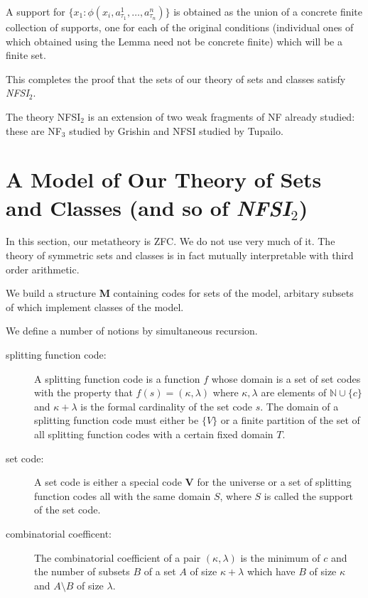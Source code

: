 \documentclass{article}
\begin{document}
\begin{description}
\begin{description}
A support for $\{x_1:\phi(x_i,a^1_{\tau_1},\ldots,a^n_{\tau_n})\}$ is obtained as the union of a concrete finite collection of supports, one for each of the original conditions (individual ones of which obtained using the Lemma need not be concrete finite) which will be a finite set.

This completes the proof that the sets of our theory of sets and classes satisfy {\em NFSI$_2$\/}.

\end{description}

The theory NFSI$_2$ is an extension of two weak fragments of NF already studied:  these are NF$_3$ studied by Grishin and NFSI studied by Tupailo.

\section{A Model of Our Theory of Sets and Classes (and so of {\em NFSI$_2$\/})}

In this section, our metatheory is ZFC.  We do not use very much of it.  The theory of symmetric sets and classes is in fact mutually interpretable with third order arithmetic.

We build a structure {\bf M} containing codes for sets of the model, arbitary subsets of which implement classes of the model.

We define a number of notions by simultaneous recursion.

\begin{description}

\item[splitting function code:]  A splitting function code is a function $f$  whose domain is a set of set codes with the property that $f(s) = (\kappa,\lambda)$ where $\kappa, \lambda$ are elements of ${\mathbb N} \cup \{c\}$ and  $\kappa+\lambda$ is the formal cardinality of the set code $s$.  The domain of a splitting function code must either be $\{V\}$ or a finite partition of the set of all splitting function codes with a certain fixed domain $T$.

\item[set code:]  A set code is either a special code {\bf V} for the universe or a set of splitting function codes all with the same domain $S$, where $S$ is called the support of the set code.

\item[combinatorial coefficent:]  The combinatorial coefficient of  a pair $(\kappa,\lambda)$ is the minimum of $c$ and the number of subsets $B$ of a set $A$ of size $\kappa+\lambda$ which have $B$ of size $\kappa$ and $A \setminus B$ of size $\lambda$.


\end{description}
\end{description}
\end{document}

